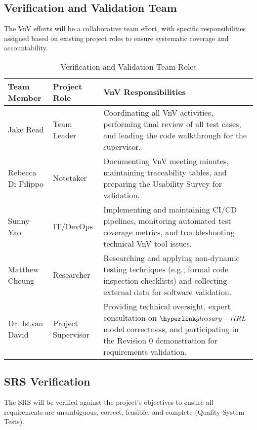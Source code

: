 \documentclass[12pt, titlepage]{article}
\begin{document}
\subsection{Verification and Validation Team}




The VnV efforts will be a collaborative team effort, with specific responsibilities assigned based on existing project roles to ensure systematic coverage and accountability.

\begin{table}[h!]
  \centering
  \caption{Verification and Validation Team Roles}
  \label{tab:vnv-team-roles}
  \begin{tabularx}{\textwidth}{|p{2cm}|p{2cm}|X|}
  \hline
  \textbf{Team Member} & \textbf{Project Role} & \textbf{VnV Responsibilities} \\ \hline
  Jake Read & Team Leader & Coordinating all VnV activities, performing final review of all test cases, and leading the code walkthrough for the supervisor. \\ \hline
  Rebecca Di Filippo & Notetaker & Documenting VnV meeting minutes, maintaining traceability tables, and preparing the Usability Survey for validation. \\ \hline
  Sunny Yao & IT/DevOps & Implementing and maintaining CI/CD pipelines, monitoring automated test coverage metrics, and troubleshooting technical VnV tool issues. \\ \hline
  Matthew Cheung & Researcher & Researching and applying non-dynamic testing techniques (e.g., formal code inspection checklists) and collecting external data for software validation. \\ \hline
  Dr. Istvan David & Project Supervisor & Providing technical oversight, expert consultation on $\RL{}$ model correctness, and participating in the Revision 0 demonstration for requirements validation. \\ \hline
  \end{tabularx}
\end{table}

\FloatBarrier


\subsection{SRS Verification}



The SRS will be verified against the project’s objectives to ensure all requirements are unambiguous, correct, feasible, and complete (Quality System Tests).
\end{document}
